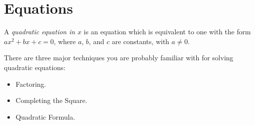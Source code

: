 \documentclass{ximera}
\begin{document}
%
%		
%		



\section{Equations}
A \emph{quadratic equation in $x$} is an equation which is equivalent to one with the form
	$ax^2 + bx + c = 0$, where $a$, $b$, and $c$ are constants, with $a \neq 0$.

There are three major techniques you are probably familiar with for solving quadratic equations:
\begin{itemize}
	\item Factoring.
	\item Completing the Square.
	\item Quadratic Formula.
\end{itemize}
\end{document}
